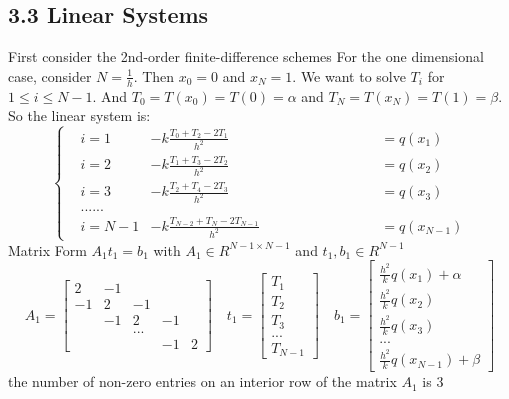 \documentclass{article}
\begin{document}
\subsection*{3.3 Linear Systems}
First consider the 2nd-order finite-difference schemes
For the one dimensional case, consider $N = \frac{1}{h}$. Then $x_0 = 0$ and $x_N = 1$. We want to solve $T_i$ for $1 \leq i \leq N-1$. And $T_0 = T(x_0) = T(0) = \alpha$ and $T_N = T(x_N) = T(1) = \beta$. So the linear system is:
$$
\left\{
\begin{aligned}
& i = 1 & -k\frac{T_{0} + T_{2} - 2T_1}{h^2}  \quad \quad  \quad \quad  \quad \quad  \quad \quad  \quad \quad & = q(x_1) \\
& i = 2 & -k\frac{T_{1} + T_{3} - 2T_2}{h^2}   \quad \quad  \quad \quad  \quad \quad  \quad \quad & = q(x_2) \\
& i = 3 & -k\frac{T_{2} + T_{4} - 2T_3}{h^2}   \quad \quad  \quad \quad  \quad \quad & = q(x_3) \\
& ......\\
& i = N-1 & -k\frac{T_{N-2} + T_{N} - 2T_{N-1}}{h^2}  & = q(x_{N-1})
\end{aligned}
\right.
$$
Matrix Form $A_1t_1 = b_1$ with $A_1 \in R^{N-1\times N-1}$ and $t_1, b_1 \in R^{N-1}$
\[
A_1 = 
\begin{bmatrix}
    2  & -1 &     &     &  \\
    -1 & 2  & -1 &     & \\
        & -1 &  2 & -1 & \\
        &     & ... &     & \\
        &     &     & -1 & 2  
\end{bmatrix}
\quad t_1 =
\begin{bmatrix}
    T_1\\
    T_2\\
    T_3\\
     ...\\
     T_{N-1}
\end{bmatrix}
\quad b_1 =
\begin{bmatrix}
    \frac{h^2}{k}q(x_1) + \alpha\\
    \frac{h^2}{k}q(x_2) \\
    \frac{h^2}{k}q(x_3)\\
     ...\\
     \frac{h^2}{k}q(x_{N-1}) + \beta
\end{bmatrix}
\]
the number of non-zero entries on an interior row of the matrix $A_1$ is $3$\\ \\
\end{document}
